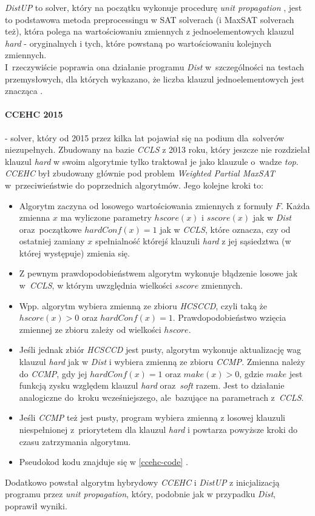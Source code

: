 \documentclass[shortabstract]{iithesis}
\begin{document}
\noindent \textit{DistUP} \label{alg:distup} to solver, który na początku wykonuje procedurę \textit{unit propagation} \cite{maxpre}, jest to podstawowa metoda preprocessingu w SAT solverach (i MaxSAT solverach też), która polega na wartościowaniu zmiennych z jednoelementowych klauzul \textit{hard} - oryginalnych i tych, które powstaną po wartościowaniu kolejnych zmiennych. \\ I~rzeczywiście poprawia ona działanie programu \textit{Dist} w~szczególności na testach przemysłowych, dla których wykazano, że liczba klauzul jednoelementowych jest znacząca \cite{unitcls}. 

\paragraph{CCEHC 2015 \cite{ccehc}} - solver, który od 2015 przez kilka lat pojawiał się na podium dla~solverów niezupełnych. Zbudowany na bazie \textit{CCLS} z 2013 roku, który jeszcze nie rozdzielał klauzul \textit{hard} w swoim algorytmie tylko traktował je jako klauzule o~wadze \textit{top}. \textit{CCEHC} był zbudowany głównie pod problem \textit{Weighted Partial MaxSAT} w~przeciwieństwie do poprzednich algorytmów.
Jego kolejne kroki to:
\begin{itemize}
	\item Algorytm zaczyna od losowego wartościowania zmiennych z formuły $F$. Każda zmienna $x$ ma wyliczone parametry $hscore(x)$ i $sscore(x)$ jak w \textit{Dist} oraz~początkowe $hardConf(x) = 1$ jak w \textit{CCLS}, które oznacza, czy od ostatniej zamiany $x$ spełnialność którejś klauzuli \textit{hard} z jej sąsiedztwa (w której występuje) zmienia się. 
	\item Z pewnym prawdopodobieństwem algorytm wykonuje błądzenie losowe jak w~\textit{CCLS}, w którym uwzględnia wielkości $sscore$ zmiennych.
	\item Wpp. algorytm wybiera zmienną ze zbioru \textit{HCSCCD}, czyli taką że $hscore(x) > 0$ oraz $hardConf(x) = 1$. Prawdopodobieństwo wzięcia zmiennej ze zbioru zależy od wielkości $hscore$.
	\item Jeśli jednak zbiór \textit{HCSCCD} jest pusty, algorytm wykonuje aktualizację wag klauzul \textit{hard} jak w \textit{Dist} i wybiera zmienną ze zbioru \textit{CCMP}. 
	Zmienna należy do \textit{CCMP}, gdy jej $hardConf(x) = 1$ oraz $make(x) > 0$, gdzie $make$ jest funkcją zysku względem klauzul \textit{hard} oraz~\textit{soft} razem. Jest to działanie analogiczne do~kroku wcześniejszego, ale~bazujące na parametrach z~\textit{CCLS}.  
	\item Jeśli \textit{CCMP} też jest pusty, program wybiera zmienną z losowej klauzuli niespełnionej z~priorytetem dla klauzul \textit{hard} i powtarza powyższe kroki do czasu zatrzymania algorytmu.
	\item Pseudokod kodu znajduje się w \ref{ccehc-code} .
\end{itemize}
Dodatkowo powstał algorytm hybrydowy \textit{CCEHC} i \textit{DistUP} z inicjalizacją programu przez \textit{unit propagation}, który, podobnie jak w przypadku \textit{Dist}, poprawił wyniki.
\end{document}

